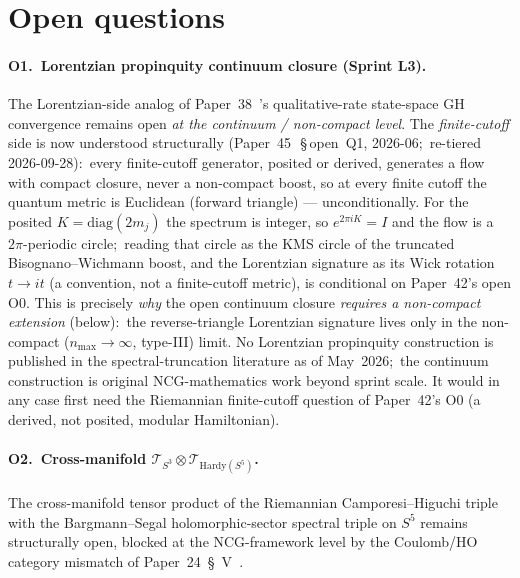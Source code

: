 \documentclass[11pt,a4paper]{article}
\theoremstyle{plain}
\theoremstyle{definition}
\newcommand{\sthree}{S^{3}}
\newcommand{\Tcal}{\mathcal{T}}
\begin{document}
\section{Open questions}\label{sec:open_questions}

\paragraph{O1.\ Lorentzian propinquity continuum closure (Sprint L3).}
The Lorentzian-side analog of Paper~38~\cite{paper38}'s qualitative-rate
state-space GH convergence remains open \emph{at the continuum / non-compact
level}. The \emph{finite-cutoff} side is now understood structurally
(Paper~45~\cite{paper45}\,\S\,open~Q1, 2026-06;\ re-tiered 2026-09-28):\
every finite-cutoff generator, posited or derived, generates a flow with
compact closure, never a non-compact boost, so at every finite cutoff the
quantum metric is Euclidean (forward triangle) --- unconditionally. For the
posited $K = \mathrm{diag}(2m_{j})$ the spectrum is integer, so
$e^{2\pi i K} = I$ and the flow is a $2\pi$-periodic circle;\ reading that
circle as the KMS circle of the truncated Bisognano--Wichmann boost, and the
Lorentzian signature as its Wick rotation $t \to it$ (a convention, not a
finite-cutoff metric), is conditional on Paper~42's open O0. This is precisely
\emph{why} the open continuum closure \emph{requires a non-compact extension}
(below):\ the reverse-triangle Lorentzian signature lives only in the
non-compact ($n_{\max} \to \infty$, type-III) limit. No Lorentzian
propinquity construction is published in the spectral-truncation literature
as of May~2026;\ the continuum construction is original NCG-mathematics work
beyond sprint scale.  It would in any case first need the Riemannian
finite-cutoff question of Paper~42's O0 (a derived, not posited,
modular Hamiltonian).

\paragraph{O2.\ Cross-manifold $\Tcal_{\sthree} \otimes
\Tcal_{\mathrm{Hardy}(S^5)}$.} The cross-manifold tensor product of
the Riemannian Camporesi--Higuchi triple with the Bargmann--Segal
holomorphic-sector spectral triple on $S^5$ remains structurally
open, blocked at the NCG-framework level by the Coulomb/HO category
mismatch of Paper~24~\S~V~\cite{paper24}.
\end{document}
